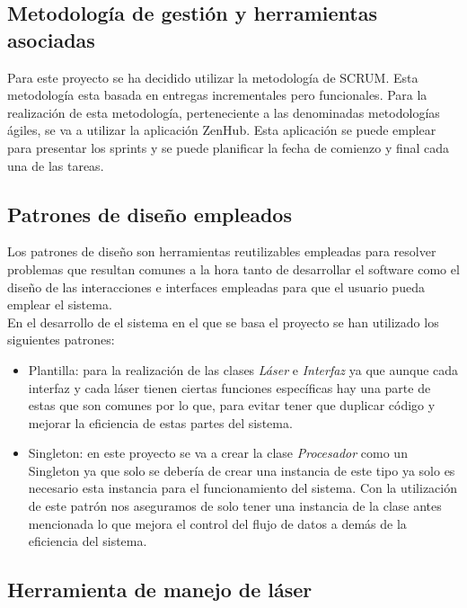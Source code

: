 \subsection{Metodología de gestión y herramientas asociadas}

Para este proyecto se ha decidido utilizar la metodología de SCRUM. Esta metodología esta basada en entregas incrementales pero funcionales. Para la realización de esta metodología, perteneciente a las denominadas metodologías ágiles, se va a utilizar la aplicación ZenHub. Esta aplicación se puede emplear para presentar los sprints y se puede planificar la fecha de comienzo y final cada una de las tareas.

\subsection{Patrones de diseño empleados}

Los patrones de diseño son herramientas reutilizables empleadas para resolver problemas que resultan comunes a la hora tanto de desarrollar el software como el diseño de las interacciones e interfaces empleadas para que el usuario pueda emplear el sistema.\\

En el desarrollo de el sistema en el que se basa el proyecto se han utilizado los siguientes patrones:
\begin{itemize}
    \item Plantilla: para la realización de las clases \textit{Láser} e \textit{Interfaz} ya que aunque cada interfaz y cada láser tienen ciertas funciones específicas hay una parte de estas que son comunes por lo que, para evitar tener que duplicar código y mejorar la eficiencia de estas partes del sistema.
    \item Singleton: en este proyecto se va a crear la clase \textit{Procesador} como un Singleton ya que solo se debería de crear una instancia de este tipo ya solo es necesario esta instancia para el funcionamiento del  sistema. Con la utilización de este patrón nos aseguramos de solo tener una instancia de la clase antes mencionada lo que mejora el control del flujo de datos a demás de la eficiencia del sistema.\\
\end{itemize}

\subsection{Herramienta de manejo de láser}

